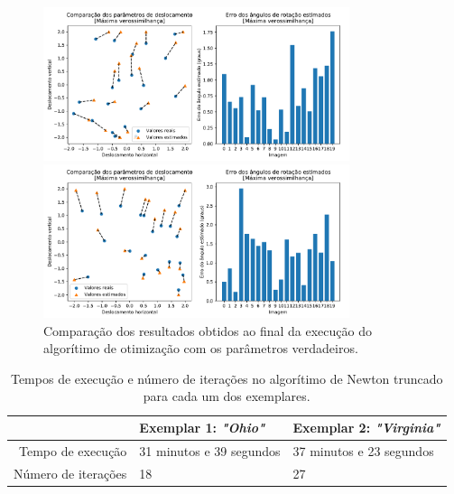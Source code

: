 \begin{figure}[H]
	\centering
	\caption{Comparação dos resultados obtidos ao final da execução do algorítimo de otimização com os parâmetros verdadeiros.}
	\label{fig:comparisson_plots}
	\begin{minipage}[b]{.99\linewidth}
		\centering
		\includegraphics[width=0.8\textwidth]{./figures/results_figures/comparisson_plot.pdf}
	\end{minipage}

	\begin{minipage}[b]{.99\linewidth}
		\centering
		\includegraphics[width=0.8\textwidth]{./figures/results_figures/comparisson_plot2.pdf}
		
	\end{minipage}
\end{figure} 

\begin{table}[H]
	\caption{Tempos de execução e número de iterações no algorítimo de Newton truncado para cada um dos exemplares.}
	\label{tab:temposexec}
	\begin{tabular}{r || l | l}
		 & Exemplar 1: \emph{"Ohio"} & Exemplar 2: \emph{"Virginia"} \\ \hline
		Tempo de execução & 31 minutos e 39 segundos & 37 minutos e 23 segundos \\ \hline
		Número de iterações & 18 & 27
	\end{tabular}
\end{table}

